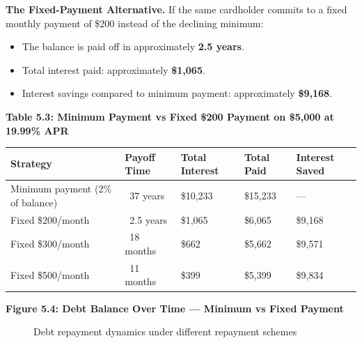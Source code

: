 \documentclass[12pt, letterpaper]{article}
\begin{document}
\textbf{The Fixed-Payment Alternative.} If the same cardholder commits to a fixed monthly payment of \$200 instead of the declining minimum:
\begin{itemize}
\item The balance is paid off in approximately \textbf{2.5 years}.
\item Total interest paid: approximately \textbf{\$1,065}.
\item Interest savings compared to minimum payment: approximately \textbf{\$9,168}.
\end{itemize}

\textbf{Table 5.3: Minimum Payment vs Fixed \$200 Payment on \$5,000 at 19.99\% APR}


\begin{table}[H]
\centering
\small
\begin{tabularx}{\linewidth}{lYYYY}
\toprule
Strategy & Payoff Time & Total Interest & Total Paid & Interest Saved \\
\midrule
Minimum payment (2\% of balance) & ~37 years & \$10,233 & \$15,233 & --- \\
Fixed \$200/month & ~2.5 years & \$1,065 & \$6,065 & \$9,168 \\
Fixed \$300/month & ~18 months & \$662 & \$5,662 & \$9,571 \\
Fixed \$500/month & ~11 months & \$399 & \$5,399 & \$9,834 \\
\bottomrule
\end{tabularx}
\end{table}


\textbf{Figure 5.4: Debt Balance Over Time --- Minimum vs Fixed Payment}

\begin{figure}[ht]
\centering
{}
\caption{Debt repayment dynamics under different repayment schemes}
\end{figure}
\end{document}
